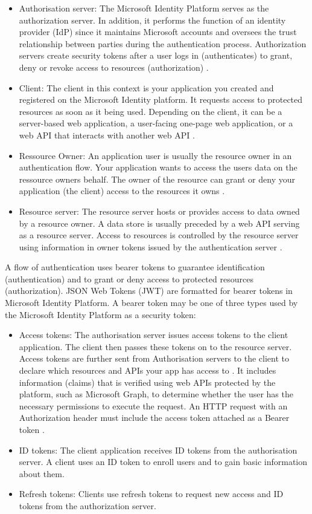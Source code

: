 \begin{itemize}
 \item Authorisation server: The Microsoft Identity Platform serves as the authorization server. In addition, it performs the function of an identity provider (IdP) since it maintains Microsoft accounts and oversees the trust relationship between parties during the authentication process. Authorization servers create security tokens after a user logs in (authenticates) to grant, deny or revoke access to resources (authorization) \cite{MSOAuthOIDr}.
 \item Client: The client in this context is your application you created and registered on the Microsoft Identity platform. It requests access to protected resources as soon as it being used. Depending on the client, it can be a server-based web application, a user-facing one-page web application, or a web API that interacts with another web API \cite{MSOAuthOIDr}. 
 \item Ressource Owner: An application user is usually the resource owner in an authentication flow. Your application wants to access the users data on the ressource owners behalf. The owner of the resource can grant or deny your application (the client) access to the resources it owns \cite{MSOAuthOIDr}. 
 \item Resource server: The resource server hosts or provides access to data owned by a resource owner. A data store is usually preceded by a web API serving as a resource server. Access to resources is controlled by the resource server using information in owner tokens issued by the authentication server \cite{MSOAuthOIDr}. 
\end{itemize}

A flow of authentication uses bearer tokens to guarantee identification (authentication) and to grant or deny access to protected resources (authorization). JSON Web Tokens (JWT) are formatted for bearer tokens in Microsoft Identity Platform. A bearer token may be one of three types used by the Microsoft Identity Platform as a security token:

\begin{itemize}
 \item Access tokens: The authorisation server issues access tokens to the client application. The client then passes these tokens on to the resource server. Access tokens are further sent from Authorisation servers to the client to declare which resources and APIs your app has access to \cite{MSOAuthOIDr}. It includes information (claims) that is verified using web APIs protected by the platform, such as Microsoft Graph, to determine whether the user has the necessary permissions to execute the request. An HTTP request with an Authorization header must include the access token attached as a Bearer token \cite{MSAA}.
 \item ID tokens: The client application receives ID tokens from the authorisation server. A client uses an ID token to enroll users and to gain basic information about them.
 \item Refresh tokens: Clients use refresh tokens to request new access and ID tokens from the authorization server.
\end{itemize}


